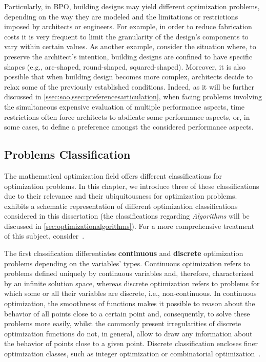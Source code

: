 	Particularly, in \ac{BPO}, building designs may yield different optimization problems, depending on the way they are modeled and the limitations or restrictions imposed by architects or engineers. For example, in order to reduce fabrication costs it is very frequent to limit the granularity of the design's components to vary within certain values. As another example, consider the situation where, to preserve the architect's intention, building designs are confined to have specific shapes (e.g., arc-shaped, round-shaped, squared-shaped). Moreover, it is also possible that when building design becomes more complex, architects decide to relax some of the previously established conditions. Indeed, as it will be further discussed in \cref{ssec:soo,ssec:preferencesarticulation}, when facing problems involving the simultaneous expensive evaluation of multiple performance aspects, time restrictions often force architects to abdicate some performance aspects, or, in some cases, to define a preference amongst the considered performance aspects.
	
\subsection{Problems Classification}
	
	The mathematical optimization field offers different classifications for optimization problems. In this chapter, we introduce three of these classifications due to their relevance and their ubiquitousness for optimization problems.  exhibits a schematic representation of different optimization classifications considered in this dissertation (the classifications regarding \textit{Algorithms} will be discussed in \cref{sec:optimizationalgorithms}). For a more comprehensive treatment of this subject, consider~\cite{Koziel2011, Nocedal2011NumericalOptimization}. 
	 
	The first classification differentiates \textbf{continuous} and \textbf{discrete} optimization problems depending on the variables' types. Continuous optimization refers to problems defined uniquely by continuous variables and, therefore, characterized by an infinite solution space, whereas discrete optimization refers to problems for which some or all their variables are discrete, i.e., non-continuous. In continuous optimization, the smoothness of functions makes it possible to reason about the behavior of all points close to a certain point and, consequently, to solve these problems more easily, whilst the commonly present irregularities of discrete optimization functions do not, in general, allow to draw any information about the behavior of points close to a given point. Discrete classification encloses finer optimization classes, such as integer optimization or combinatorial optimization~\cite{Nemhauser1988}. 
	
